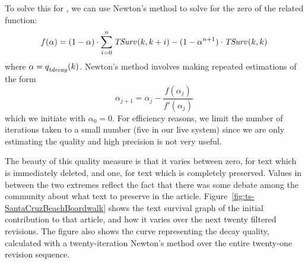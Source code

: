 To solve this for , we can use Newton's method
to solve for the zero of the related function:
\begin{equation*}
  f(\alpha) = (1 - \alpha) \cdot \sum_{i=0}^n \mathit{TSurv}_{}(k,k+i)
        - (1 - \alpha^{n+1}) \cdot \mathit{TSurv}_{}(k,k)
\end{equation*}
where $\alpha = \quality{tdecay}{}{k}$.
Newton's method involves making repeated estimations of the form
\begin{equation*}
  \alpha_{j+1} = \alpha_j - \frac{f(\alpha_j)}{f'(\alpha_j)}
\end{equation*}
which we initiate with $\alpha_0 = 0$.
For efficiency reasons, we limit the number of iterations taken
to a small number (five in our live system)
since we are only estimating the quality and high precision
is not very useful.

The beauty of this quality measure is that it varies between
zero, for text which is immediately deleted, and one, for text
which is completely preserved.
Values in between the two extremes reflect the fact that there
was some debate among the community about what text to preserve
in the article.
Figure~\ref{fig:ts-SantaCruzBeachBoardwalk} shows the text survival
graph of the initial contribution to that article, and how it varies
over the next twenty filtered revisions.
The figure also shows the curve representing the decay quality,
calculated with a twenty-iteration Newton's method over the entire
twenty-one revision sequence.


